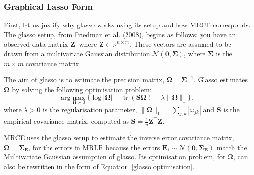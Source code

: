 \documentclass[11pt]{report} %
\begin{document}
\vspace{-0.2cm}
\subsubsection{Graphical Lasso Form}
\label{glasso}
First, let us justify why glasso works using its setup and how MRCE corresponds. The glasso setup, from Friedman et al. (2008), begins as follows: you have an observed data matrix $\mathbf{Z}$, where $\mathbf{Z}\in\mathbb{R}^{n \times m}$. These vectors are assumed to be drawn from a multivariate Gaussian distribution \(\mathcal{N}(\mathbf{0}, \boldsymbol{\Sigma})\), where \(\boldsymbol{\Sigma}\) is the \(m \times m\) covariance matrix.

The aim of glasso is to estimate the precision matrix, \(\boldsymbol{\Omega} = \boldsymbol{\Sigma}^{-1}\).
Glasso estimates \(\boldsymbol{\Omega}\) by solving the following optimisation problem:
\begin{equation}
\text{arg}\max_{\boldsymbol{\Omega} \succ 0} \{ \log |\boldsymbol{\Omega}| - \operatorname{tr}(\mathbf{S} \boldsymbol{\Omega}) - \lambda \|\boldsymbol{\Omega}\|_1 \},
\label{glasso optimisation}
\end{equation}
where $\lambda > 0$ is the regularisation parameter, \(\|\boldsymbol{\Omega}\|_1 = \sum_{j,k} |\omega_{jk}|\) and \(\mathbf{S}\) is the empirical covariance matrix, computed as \(\mathbf{S} = \frac{1}{n} \mathbf{Z}^\top \mathbf{Z}\).\cite{friedman2008sparse}

\noindent MRCE uses the glasso setup to estimate the inverse error covariance matrix, \(\boldsymbol{\Omega}=\mathbf{\Sigma_E}\), for the errors in MRLR because the errors \(\mathbf{E}_i \sim \mathcal{N}(\mathbf{0}, \mathbf{\Sigma_E})\) match the Multivariate Gaussian assumption of glasso. Its optimisation problem, for $\mathbf{\Omega}$, can also be rewritten in the form of Equation~\ref{glasso optimisation}. 
\end{document}
